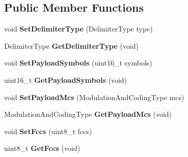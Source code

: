 \subsection*{\-Public \-Member \-Functions}
\begin{DoxyCompactItemize}
\item 
\hypertarget{classns3_1_1PLC__PhyFrameControlHeader_a3d0f4069bfbfd3e8466a97efe06032a2}{void {\bfseries \-Set\-Delimiter\-Type} (\-Delimiter\-Type type)}\label{classns3_1_1PLC__PhyFrameControlHeader_a3d0f4069bfbfd3e8466a97efe06032a2}

\item 
\hypertarget{classns3_1_1PLC__PhyFrameControlHeader_adb918e36a794abd4c9dc6e9fd6bae56c}{\-Delimiter\-Type {\bfseries \-Get\-Delimiter\-Type} (void)}\label{classns3_1_1PLC__PhyFrameControlHeader_adb918e36a794abd4c9dc6e9fd6bae56c}

\item 
\hypertarget{classns3_1_1PLC__PhyFrameControlHeader_a484498050ccfd92891c7ffb5a2dc8d3e}{void {\bfseries \-Set\-Payload\-Symbols} (uint16\-\_\-t symbols)}\label{classns3_1_1PLC__PhyFrameControlHeader_a484498050ccfd92891c7ffb5a2dc8d3e}

\item 
\hypertarget{classns3_1_1PLC__PhyFrameControlHeader_a5a6daa9dfeabc8d8d9b5c7b539174ee6}{uint16\-\_\-t {\bfseries \-Get\-Payload\-Symbols} (void)}\label{classns3_1_1PLC__PhyFrameControlHeader_a5a6daa9dfeabc8d8d9b5c7b539174ee6}

\item 
\hypertarget{classns3_1_1PLC__PhyFrameControlHeader_af5471f23e38c55514388edf570c7b2ef}{void {\bfseries \-Set\-Payload\-Mcs} (\-Modulation\-And\-Coding\-Type mcs)}\label{classns3_1_1PLC__PhyFrameControlHeader_af5471f23e38c55514388edf570c7b2ef}

\item 
\hypertarget{classns3_1_1PLC__PhyFrameControlHeader_a3739ba6c1e65fb76d53e1bb1efab50c3}{\-Modulation\-And\-Coding\-Type {\bfseries \-Get\-Payload\-Mcs} (void)}\label{classns3_1_1PLC__PhyFrameControlHeader_a3739ba6c1e65fb76d53e1bb1efab50c3}

\item 
\hypertarget{classns3_1_1PLC__PhyFrameControlHeader_a01a281508b2e77c75e45e8e97f643ad6}{void {\bfseries \-Set\-Fccs} (uint8\-\_\-t fccs)}\label{classns3_1_1PLC__PhyFrameControlHeader_a01a281508b2e77c75e45e8e97f643ad6}

\item 
\hypertarget{classns3_1_1PLC__PhyFrameControlHeader_a1797daae89d9791895ea52bc813298ab}{uint8\-\_\-t {\bfseries \-Get\-Fccs} (void)}\label{classns3_1_1PLC__PhyFrameControlHeader_a1797daae89d9791895ea52bc813298ab}


\end{DoxyCompactItemize}
